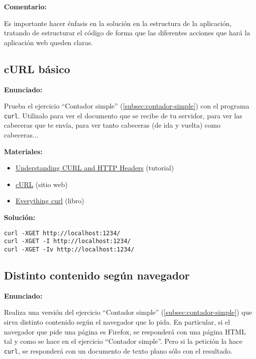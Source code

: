 \textbf{Comentario:}

Es importante hacer énfasis en la solución en la estructura de la aplicación, tratando de estructurar el código de forma que las diferentes acciones que hará la aplicación web queden claras.

\subsection{cURL básico}
\label{subsec:curl-basico}

\textbf{Enunciado:}

Prueba el ejercicio ``Contador simple'' (\ref{subsec:contador-simple}) con el programa \verb|curl|. Utilizalo para ver el documento que se recibe de tu servidor, para ver las cabeceras que te envía, para ver tanto cabeceras (de ida y vuelta) como cabeceras...

\textbf{Materiales:}

\begin{itemize}
\item \href{https://linuxacademy.com/guide/13852-understanding-curl-and-http-headers/}{Understanding CURL and HTTP Headers} (tutorial)
\item \href{https://curl.haxx.se/}{cURL} (sitio web)
\item \href{https://curl.haxx.se/book.html}{Everything curl} (libro)
\end{itemize}

\textbf{Solución:}

\begin{verbatim}
curl -XGET http://localhost:1234/
curl -XGET -I http://localhost:1234/
curl -XGET -Iv http://localhost:1234/
\end{verbatim}

\subsection{Distinto contenido según navegador}
\label{subsec:contador-simple-navegador}

\textbf{Enunciado:}

Realiza una versión del ejercicio ``Contador simple'' (\ref{subsec:contador-simple}) que sirva distinto contenido según el navegador que lo pida. En particular, si el navegador que pide una página es Firefox, se responderá con una página HTML tal y como se hace en el ejercicio ``Contador simple''. Pero si la petición la hace \verb|curl|, se responderá con un documento de texto plano sólo con el resultado.

